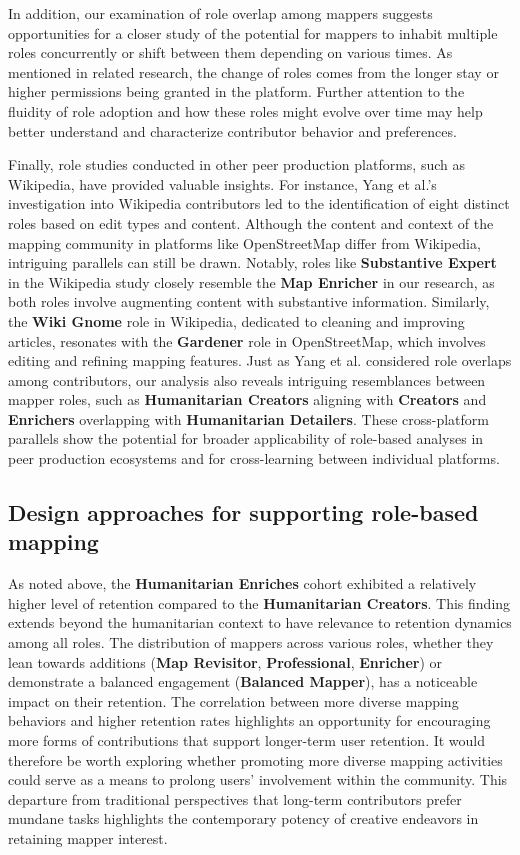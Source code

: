 \documentclass[manuscript,screen,review]{acmart}
\begin{document}
In addition, our examination of role overlap among mappers suggests opportunities for a closer study of the potential for mappers to inhabit multiple roles concurrently or shift between them depending on various times. As mentioned in related research, the change of roles comes from the longer stay \cite{BeginDR18} or higher permissions being granted \cite{Arazy15} in the platform. Further attention to the fluidity of role adoption and how these roles might evolve over time may help better understand and characterize contributor behavior and preferences. 

Finally, role studies conducted in other peer production platforms, such as Wikipedia, have provided valuable insights. For instance, Yang et al.'s\cite{Yang21} investigation into Wikipedia contributors led to the identification of eight distinct roles based on edit types and content. Although the content and context of the mapping community in platforms like OpenStreetMap differ from Wikipedia, intriguing parallels can still be drawn. Notably, roles like \textbf{Substantive Expert} in the Wikipedia study closely resemble the \textbf{Map Enricher} in our research, as both roles involve augmenting content with substantive information. Similarly, the \textbf{Wiki Gnome} role in Wikipedia, dedicated to cleaning and improving articles, resonates with the \textbf{Gardener} role in OpenStreetMap, which involves editing and refining mapping features. Just as Yang et al. considered role overlaps among contributors, our analysis also reveals intriguing resemblances between mapper roles, such as \textbf{Humanitarian Creators} aligning with \textbf{Creators} and \textbf{Enrichers} overlapping with \textbf{Humanitarian Detailers}. These cross-platform parallels show the potential for broader applicability of role-based analyses in peer production ecosystems and for cross-learning between individual platforms.

\subsection{Design approaches for supporting role-based mapping}

As noted above, the \textbf{Humanitarian Enriches} cohort exhibited a relatively higher level of retention compared to the \textbf{Humanitarian Creators}. This finding extends beyond the humanitarian context to have relevance to retention dynamics among all roles. The distribution of mappers across various roles, whether they lean towards additions (\textbf{Map Revisitor}, \textbf{Professional}, \textbf{Enricher}) or demonstrate a balanced engagement (\textbf{Balanced Mapper}), has a noticeable impact on their retention. The correlation between more diverse mapping behaviors and higher retention rates highlights an opportunity for encouraging more forms of contributions that support longer-term user retention. It would therefore be worth exploring whether promoting more diverse mapping activities could serve as a means to prolong users' involvement within the community. This departure from traditional perspectives that long-term contributors prefer mundane tasks\cite{shah_2006} highlights the contemporary potency of creative endeavors in retaining mapper interest. 
\end{document}

